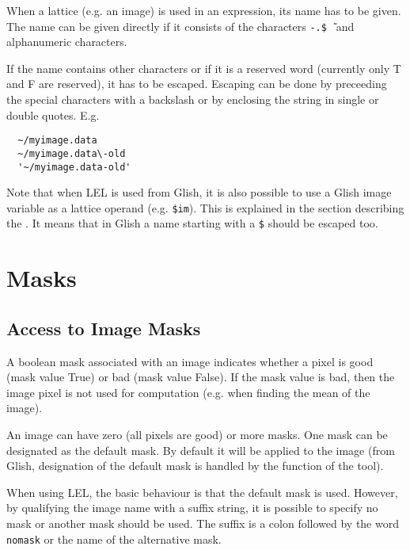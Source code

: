 When a lattice (e.g.  an image) is used in an expression, its name has
to be given.  The name can be given directly if it consists of the
characters \texttt{-}\texttt{.}\texttt{\$}\texttt{\~\ } and alphanumeric
characters. 

\medskip\noindent If the name contains other characters or if it is a reserved word
(currently only T and F are reserved), it has to be escaped.  Escaping
can be done by preceeding the special characters with a backslash or by
enclosing the string in single or double quotes.  E.g. 

\begin{verbatim}
  ~/myimage.data
  ~/myimage.data\-old
  '~/myimage.data-old'
\end{verbatim}

\medskip\noindent Note that when LEL is used from Glish, it is also possible to use
a Glish image variable as a lattice operand (e.g. \texttt{\$im}).
This is explained in the section describing the
. It means that in Glish a
name starting with a \texttt{\$} should be escaped too.


\section{\label{LEL:MASKS}Masks}

\subsection{Access to Image Masks}

A boolean mask associated with an image indicates whether a pixel is
good (mask value True) or bad (mask value False).  If the mask value is
bad, then the image pixel is not used for computation (e.g.  when
finding the mean of the image). 

\medskip\noindent An image can have zero (all pixels are good) or more masks.  One mask
can be designated as the default mask.  By default it will be applied to
the image (from Glish, designation of the default mask is handled by the
 function
of the  tool).

\medskip\noindent When using LEL, the basic behaviour is that the default mask is used. 
However, by qualifying the image name with a suffix string, it is
possible to specify no mask or another mask should be used.  The suffix
is a colon followed by the word \texttt{nomask} or the name of the
alternative mask.

